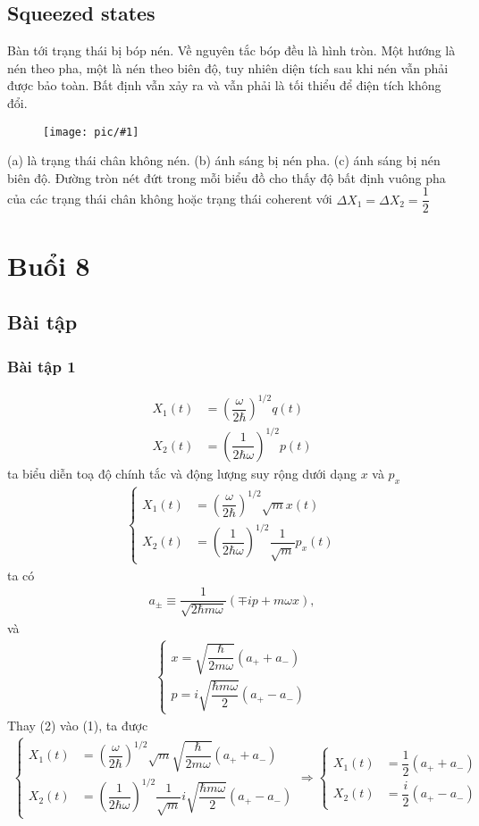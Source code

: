 \documentclass{report}
\newcommand{\image}[1]{
\begin{figure}[H]
	\centering
	\texttt{[image: pic/\#1]}
	\label{#1}
\end{figure}
}
\newcommand{\f}[2]{\dfrac{#1}{#2}}
\begin{document}
\section{Squeezed states}
Bàn tới trạng thái bị bóp nén. Về nguyên tắc bóp đều là hình tròn. Một hướng là nén theo pha, một là nén theo biên độ, tuy nhiên diện tích sau khi nén vẫn phải được bảo toàn. Bất định vẫn xảy ra và vẫn phải là tối thiểu để điện tích không đổi.
\image{phavuong.png}
(a) là trạng thái chân không nén. (b) ánh sáng bị nén pha. (c) ánh sáng bị nén biên độ. Đường tròn nét đứt trong mỗi biểu đồ cho thấy độ bất định vuông pha của các trạng thái chân không hoặc trạng thái coherent với $\Delta X_{1} = \Delta X_{2} = \f{1}{2}$
\chapter{Buổi 8}
\section{Bài tập}
\subsection*{Bài tập 1}
\begin{align*}
	X_{1} (t) &= \left(\f{\omega}{2 \hbar}\right)^{1/2} q(t) \\
	X_{2} (t) &= \left(\f{1}{2 \hbar \omega}\right)^{1/2} p(t)
\end{align*}
ta biểu diễn toạ độ chính tắc và động lượng suy rộng dưới dạng $x$ và $p_{x}$
\begin{align}
	\begin{cases}
		X_{1} (t) &= \left(\f{\omega}{2 \hbar}\right)^{1/2} \sqrt{m} x(t) \\
		X_{2} (t) &= \left(\f{1}{2 \hbar \omega}\right)^{1/2} \f{1}{\sqrt{m}} p_{x}(t)
	\end{cases}
\end{align}	
ta có 
\begin{align*}
	a_{\pm} \equiv \f{1}{\sqrt{2 \hbar m \omega}} \left( \mp i p + m \omega x \right),
\end{align*}
và
\begin{align}
	\begin{cases}
		x = \sqrt{\f{\hbar}{2 m \omega}} \left( a_{+} + a_{-} \right)\\
		p = i \sqrt{\f{\hbar m \omega}{2}} \left( a_{+} - a_{-} \right)
	\end{cases}
\end{align}	
Thay (2) vào (1), ta được
\begin{align}
	\begin{cases}
		X_{1} (t) &= \left(\f{\omega}{2 \hbar}\right)^{1/2} \sqrt{m} \sqrt{\f{\hbar}{2 m \omega}} \left( a_{+} + a_{-} \right) \\
		X_{2} (t) &= \left(\f{1}{2 \hbar \omega}\right)^{1/2} \f{1}{\sqrt{m}}  i \sqrt{\f{\hbar m \omega}{2}} \left( a_{+} - a_{-} \right)
	\end{cases}
	\Rightarrow
	\begin{cases}
		X_{1}(t) & = \f{1}{2} \left( a_{+} + a_{-} \right)\\
		X_{2}(t) & = \f{i}{2} \left( a_{+} - a_{-} \right)
	\end{cases}
\end{align}		
\end{document}
